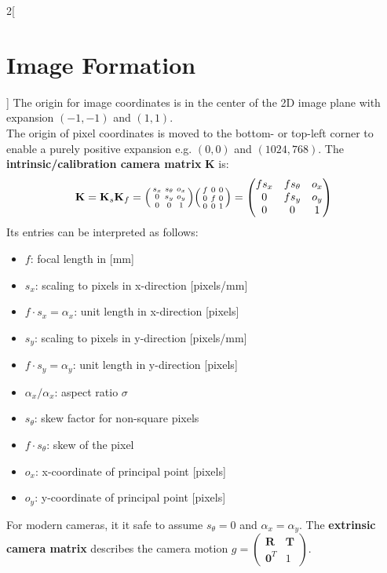 \documentclass[oneside,fontsize=11pt,paper=a4]{scrartcl}
\begin{document}
\begin{multicols}{2}[\section{Image Formation}]
The origin for image coordinates is in the center of the 2D image plane with expansion $(-1, -1)$ and $(1, 1)$.\\
The origin of pixel coordinates is moved to the bottom- or top-left corner to enable a purely positive expansion e.g. $(0, 0)$ and $(1024, 768)$. The \textbf{intrinsic/calibration camera matrix} $\mathbf{K}$ is:
\begin{equation*}
	\mathbf{K} = \mathbf{K}_s \mathbf{K}_f = \begin{psmallmatrix} s_x & s_{\theta} & o_x\\0 & s_y & o_y\\0 & 0 & 1\end{psmallmatrix}\begin{psmallmatrix} f & 0 & 0\\0 & f & 0\\0 & 0 & 1\end{psmallmatrix} = \begin{pmatrix}f s_x & f s_{\theta} & o_x\\0 & f s_y & o_y\\0 & 0 & 1 \end{pmatrix}
\end{equation*}
Its entries can be interpreted as follows:
\begin{itemize}
    \item $f$: focal length in [mm]
    \item $s_x$: scaling to pixels in x-direction [pixels/mm]
    \item $f\cdot s_x = \alpha_x$: unit length in x-direction [pixels]
    \item $s_y$: scaling to pixels in y-direction [pixels/mm]
    \item $f\cdot s_y = \alpha_y$: unit length in y-direction [pixels]
    \item $\alpha_x / \alpha_x$: aspect ratio $\sigma$
    \item $s_{\theta}$: skew factor for non-square pixels
    \item $f\cdot s_{\theta}$: skew of the pixel
    \item $o_x$: x-coordinate of principal point [pixels]
    \item $o_y$: y-coordinate of principal point [pixels]
\end{itemize}
For modern cameras, it it safe to assume $s_\theta=0$ and $\alpha_x=\alpha_y$. The \textbf{extrinsic camera matrix} describes the camera motion $g = \begin{pmatrix}\mathbf{R} & \mathbf{T}\\\mathbf{0}^T & 1 \end{pmatrix}$.



\end{multicols}
\end{document}

